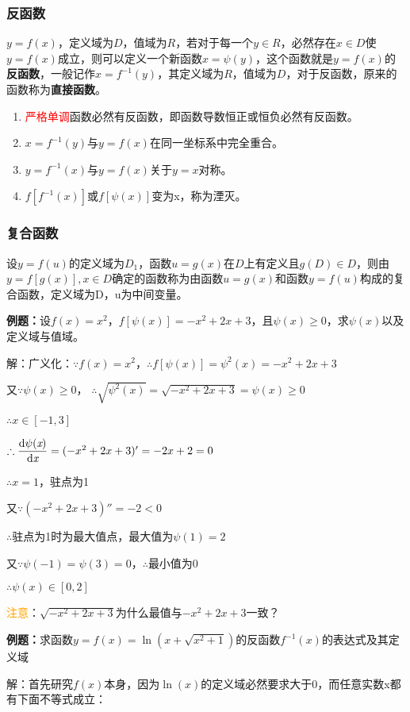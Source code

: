 \documentclass[UTF8, 12pt]{ctexart}
\begin{document}
\subsubsection{反函数}
$y=f(x)$，定义域为$D$，值域为$R$，若对于每一个$y\in R$，必然存在$x\in D$使$y=f(x)$成立，则可以定义一个新函数$x=\psi(y)$，这个函数就是$y=f(x)$的\textbf{反函数}，一般记作$x=f^{-1}(y)$，其定义域为$R$，值域为$D$，对于反函数，原来的函数称为\textbf{直接函数}。
\begin{enumerate}
    \item \textcolor{red}{严格单调}函数必然有反函数，即函数导数恒正或恒负必然有反函数。
    \item $x=f^{-1}(y)$与$y=f(x)$在同一坐标系中完全重合。
    \item $y=f^{-1}(x)$与$y=f(x)$关于$y=x$对称。
    \item $f[f^{-1}(x)]$或$f[\psi(x)]$变为x，称为湮灭。
\end{enumerate}
\subsubsection{复合函数}
设$y=f(u)$的定义域为$D_1$，函数$u=g(x)$在$D$上有定义且$g(D)\in D$，则由$y=f[g(x)],x\in D$确定的函数称为由函数$u=g(x)$和函数$y=f(u)$构成的复合函数，定义域为D，u为中间变量。

\textbf{例题：}设$f(x)=x^2$，$f[\psi(x)]=-x^2+2x+3$，且$\psi(x)\geqslant 0$，求$\psi(x)$以及定义域与值域。

解：广义化：$\because f(x)=x^2$，$\therefore f[\psi(x)]=\psi^2(x)=-x^2+2x+3$

又$\because\psi(x)\geqslant 0$， $\therefore\sqrt{\psi^2(x)}=\sqrt{-x^2+2x+3}=\psi(x)\geqslant 0$

$\therefore x\in[-1,3]$

$\therefore\dfrac{\rm{d}\psi(\textit{x})}{\rm{d}\textit{x}}=(-x^2+2x+3)'=-2x+2=0$

$\therefore x=1$，驻点为1

又$\because(-x^2+2x+3)''=-2<0$

$\therefore$驻点为1时为最大值点，最大值为$\psi(1)=2$

又$\because\psi(-1)=\psi(3)=0$，$\therefore$最小值为0

$\therefore\psi(x)\in[0,2]$

\textcolor{orange}{注意}：$\sqrt{-x^2+2x+3}$为什么最值与$-x^2+2x+3$一致？

\textbf{例题：}求函数$y=f(x)=\ln(x+\sqrt{x^2+1})$的反函数$f^{-1}(x)$的表达式及其定义域

解：首先研究$f(x)$本身，因为$\ln(x)$的定义域必然要求大于0，而任意实数x都有下面不等式成立：
\end{document}
